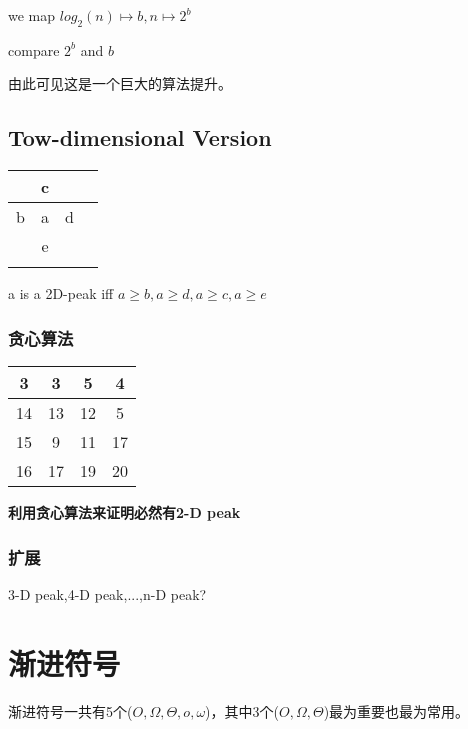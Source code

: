 \documentclass[11pt]{article}
\begin{document}
\begin{CJK}{UTF8}{gbsn}
\begin{itemize}
  we map $log_2(n)\mapsto b, n\mapsto 2^b$

  compare $2^b$ and $b$
\end{itemize}

由此可见这是一个巨大的算法提升。

\subsection{Tow-dimensional Version}

\begin{center}
  \begin{tabular}{|c|c|c|c|}
    \hline
     & c & &  \\\hline
    b & a & d & \\\hline
    & e & & \\\hline
    & & & \\
    \hline
  \end{tabular}
\end{center}

a is a 2D-peak iff $a \geq b, a \geq d, a \geq c, a \geq e$

\subsubsection{贪心算法}

\begin{center}
  \begin{tabular}{|c|c|c|c|}
    \hline
    3 & 3 & 5 & 4 \\\hline
    14 & 13 & 12 & 5 \\\hline
    15 & 9 & 11 & 17 \\\hline
    16 & 17 & 19 & 20 \\
    \hline
  \end{tabular}
\end{center}

\textbf{利用贪心算法来证明必然有2-D peak}



\subsubsection{扩展}

3-D peak,4-D peak,...,n-D peak?

\section{渐进符号}

渐进符号一共有5个($O,\Omega,\Theta, o, \omega$)，其中3个($O,\Omega,\Theta$)最为重要也最为常用。







\end{CJK}
\end{document}
